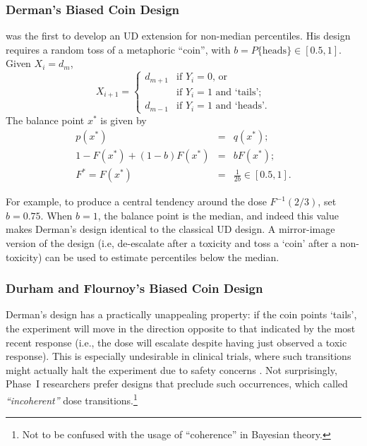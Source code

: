 \subsubsection{Derman's Biased Coin Design}
\cite{Derm:Nonp:1957} was the first to develop an UD extension for non-median percentiles. His design requires a random toss of a metaphoric ``coin'', with $b=P\{\textrm{heads}\}\in[0.5,1]$. Given $X_i=d_m$,
\begin{equation*}
X_{i+1}=
\begin{cases}
d_{m+1} &\textrm{if $Y_i=0$, or}\\
& \textrm{if $Y_i=1$ and `tails'; }\\
d_{m-1} &\textrm{if $Y_i=1$ and `heads'.}
\end{cases}
\end{equation*}
The balance point $x^*$ is given by
\begin{equation}\label{eq:dermanx*}
\begin{array}{rcl}
p(x^*)&=&q(x^*);\\
1-F\left(x^*\right)+(1-b)F\left(x^*\right) &=& bF\left(x^*\right);\\
F^*=F\left(x^*\right) &=& \frac{1}{2b}\in[0.5,1].
\end{array}
\end{equation}

For example, to produce a central tendency around the dose $F^{-1}(2/3)$, set $b=0.75$. When $b=1$, the balance point is the median, and indeed this value makes Derman's design identical to the classical UD design. A mirror-image version of the design (i.e, de-escalate after a toxicity and toss a `coin' after a non-toxicity) can be used to estimate percentiles below the median.

\subsubsection{Durham and Flournoy's  Biased Coin Design}

Derman's design has a practically unappealing property: if the coin points `tails', the experiment will move in the direction opposite to that indicated by the most recent response (i.e., the dose will escalate despite having just observed a toxic response). This is especially undesirable in clinical trials, where such transitions might actually halt the experiment due to safety concerns \citep[e.g.,][]{Neunsch08}. Not surprisingly, Phase~I researchers prefer designs that preclude such occurrences, which \cite{Cheung:coherent:05} called \emph{``incoherent''} dose transitions.\footnote{Not to be confused with the usage of ``coherence'' in Bayesian theory.}

